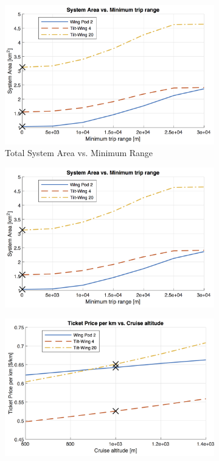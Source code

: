 \begin{figure}[H]
\begin{subfigure}[t]{0.33\textwidth}
    \centering
    \includegraphics[width=\textwidth]{Figures/report_sys_area.png}
    \captionsetup{justification=centering}
    \caption{Total System Area vs. Minimum Range}
    \label{fig:sens1}
\end{subfigure}
\begin{subfigure}[t]{0.33\textwidth}
    \centering
    \includegraphics[width=\textwidth]{Figures/report_sys_area.png}
    \captionsetup{justification=centering}
    \caption{}
    \label{fig:sens2}
\end{subfigure}
\begin{subfigure}[t]{0.33\textwidth}
    \centering
    \includegraphics[width=\textwidth]{Figures/Alt_TPrice_perkmNOPAD.png}

\end{subfigure}
\end{figure}
